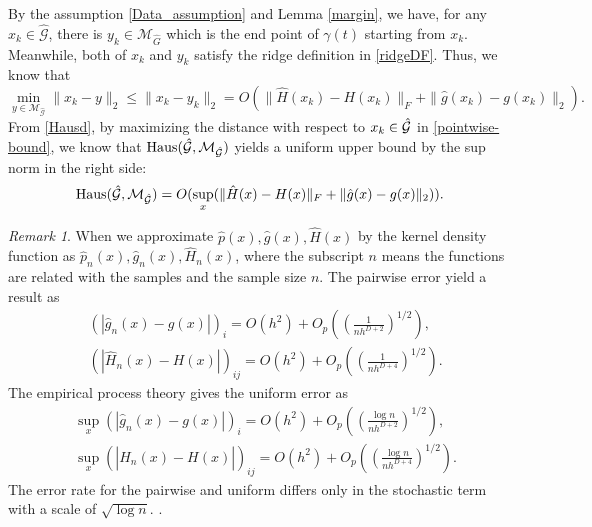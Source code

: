 \documentclass[aos,preprint]{imsart}
\theoremstyle{remark}
\newtheorem*{remark}{Remark}
\begin{document}
By the assumption \ref{Data_assumption} and Lemma \ref{margin}, we have, for any $x_k\in \hat{\mathcal G}$, there is $y_k\in {\mathcal M_{\hat{G}}}$ which is the end point of $\gamma(t)$ starting from $x_k$. Meanwhile, both of $x_k$ and $y_k$ satisfy the ridge definition in \eqref{ridgeDF}. 
Thus, we know that 
\begin{equation}\label{pointwise-bound}
\min_{y\in {\mathcal M}_{\hat{\mathcal G}}}\|x_k-y\|_2 \leq \|x_k-y_k\|_2 = O (\|\hat{H}(x_k)-H(x_k)\|_F+\|\hat{g}(x_k)-g(x_k)\|_2  ).
\end{equation}
From \eqref{Hausd}, by maximizing the distance with respect to $x_k\in 
\hat{\cal G}$ in \eqref{pointwise-bound}, we know that ${\rm Haus}({\mathcal {\hat{G}}}, {\mathcal M}_{\mathcal {\hat{G}}})$ yields a uniform upper bound by the sup norm in the right side:
\begin{equation}\label{Hausmargin}
{\rm Haus}({\hat{\mathcal G}}, {\mathcal M}_{\hat{\mathcal G}}) = O (\sup_x( \|\hat{H}(x)-H(x)\|_F+\|\hat{g}(x)-g(x)\|_2 ) ).
\end{equation}
\begin{remark}
When we approximate $\hat{p}(x), \hat{g}(x), \hat{H}(x)$ by the kernel density function as $\hat{p}_n(x), \hat{g}_n(x), \hat{H}_n(x)$, where the subscript $n$ means the functions are related with the samples and the sample size $n$. The pairwise error yield a result as
\[
\begin{aligned}
& ( |\hat{g}_n(x)-g(x)|)_i = O(h^2) + O_p((\frac{1}{{{n h^{D+2}}}})^{1/2}),\\
& ( | \hat{H}_n(x)-H(x)| )_{ij} = O(h^2) + O_p((\frac{1}{{{n h^{D+4}}}})^{1/2}).
\end{aligned}
\]
The empirical process theory gives the uniform error as
\[
\begin{aligned}
& \sup_x( |\hat{g}_n(x)-g(x)|)_i = O(h^2) + O_p((\frac{\log n}{{{n h^{D+2}}}})^{1/2}),\\
& \sup_x( |\hat{H}_n(x)-H(x)| )_{ij} = O(h^2) + O_p((\frac{\log n}{{{n h^{D+4}}}})^{1/2}).
\end{aligned}
\]
The error rate for the pairwise and uniform differs only in the stochastic term with a scale of $\sqrt{\log n}$. \cite{chen2017tutorial,JMLR:v17:ariascastro16a, genovese2014nonparametric}.
\end{remark}
\end{document}
